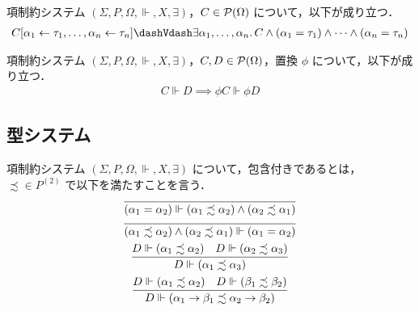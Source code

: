 \begin{lemma}
  項制約システム $(\Sigma, P, \Omega, \Vdash, X, \exists)$，$C \in \mathcal{P}(\Omega)$ について，以下が成り立つ．
  \begin{align*}
    C[\alpha_1 \assign \tau_1, \ldots, \alpha_n \assign \tau_n] \dashVdash \exists \alpha_1, \ldots, \alpha_n\ldotp C \land (\alpha_1 = \tau_1) \land \cdots \land (\alpha_n = \tau_n)
  \end{align*}
\end{lemma}

\begin{lemma}[置換 (substitution)]
  項制約システム $(\Sigma, P, \Omega, \Vdash, X, \exists)$，$C, D \in \mathcal{P}(\Omega)$，置換 $\phi$ について，以下が成り立つ．
  \begin{align*}
    C \Vdash D \implies \phi C \Vdash \phi D
  \end{align*}
\end{lemma}

\subsection{型システム}

\begin{definition}[包含 (subsumption)]
  項制約システム $(\Sigma, P, \Omega, \Vdash, X, \exists)$ について，包含付きであるとは，${\precsim} \in P^{(2)}$ で以下を満たすことを言う．
  \begin{gather*}
    \infer{(\alpha_1 = \alpha_2) \Vdash (\alpha_1 \precsim \alpha_2) \land (\alpha_2 \precsim \alpha_1)}{}
    \\
    \infer{(\alpha_1 \precsim \alpha_2) \land (\alpha_2 \precsim \alpha_1) \Vdash (\alpha_1 = \alpha_2)}{}
    \\
    \infer{D \Vdash (\alpha_1 \precsim \alpha_3)}{
      D \Vdash (\alpha_1 \precsim \alpha_2)
      &
      D \Vdash (\alpha_2 \precsim \alpha_3)
    }
    \\
    \infer{D \Vdash (\alpha_1 \to \beta_1 \precsim \alpha_2 \to \beta_2)}{
      D \Vdash (\alpha_1 \precsim \alpha_2)
      &
      D \Vdash (\beta_1 \precsim \beta_2)
    }
  \end{gather*}
\end{definition}

